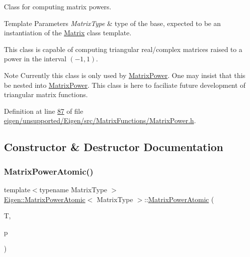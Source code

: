Class for computing matrix powers. 


\begin{DoxyTemplParams}{Template Parameters}
{\em Matrix\+Type} & type of the base, expected to be an instantiation of the \hyperlink{group___core___module_class_eigen_1_1_matrix}{Matrix} class template.\\
\hline
\end{DoxyTemplParams}
This class is capable of computing triangular real/complex matrices raised to a power in the interval $ (-1, 1) $.

\begin{DoxyNote}{Note}
Currently this class is only used by \hyperlink{class_eigen_1_1_matrix_power}{Matrix\+Power}. One may insist that this be nested into \hyperlink{class_eigen_1_1_matrix_power}{Matrix\+Power}. This class is here to faciliate future development of triangular matrix functions. 
\end{DoxyNote}


Definition at line \hyperlink{eigen_2unsupported_2_eigen_2src_2_matrix_functions_2_matrix_power_8h_source_l00087}{87} of file \hyperlink{eigen_2unsupported_2_eigen_2src_2_matrix_functions_2_matrix_power_8h_source}{eigen/unsupported/\+Eigen/src/\+Matrix\+Functions/\+Matrix\+Power.\+h}.



\subsection{Constructor \& Destructor Documentation}
\mbox{\label{class_eigen_1_1_matrix_power_atomic_ac0ec5f8d6c203cd9b53e2c95e01037d4}} 
\subsubsection{\texorpdfstring{Matrix\+Power\+Atomic()}{MatrixPowerAtomic()}\hspace{0.1cm}{\footnotesize\ttfamily [1/2]}}
{\footnotesize\ttfamily template$<$typename Matrix\+Type $>$ \\
\hyperlink{class_eigen_1_1_matrix_power_atomic}{Eigen\+::\+Matrix\+Power\+Atomic}$<$ Matrix\+Type $>$\+::\hyperlink{class_eigen_1_1_matrix_power_atomic}{Matrix\+Power\+Atomic} (\begin{DoxyParamCaption}\item[{const Matrix\+Type \&}]{T,  }\item[{Real\+Scalar}]{p }\end{DoxyParamCaption})}



